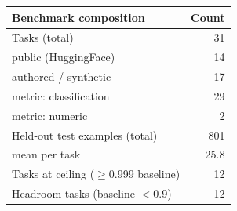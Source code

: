 \begin{tabular}{lr}
\toprule
Benchmark composition & Count \\
\midrule
Tasks (total) & 31 \\
\quad public (HuggingFace) & 14 \\
\quad authored / synthetic & 17 \\
\midrule
metric: classification & 29 \\
metric: numeric & 2 \\
\midrule
Held-out test examples (total) & 801 \\
\quad mean per task & 25.8 \\
Tasks at ceiling ($\geq$0.999 baseline) & 12 \\
Headroom tasks (baseline $<$0.9) & 12 \\
\bottomrule
\end{tabular}